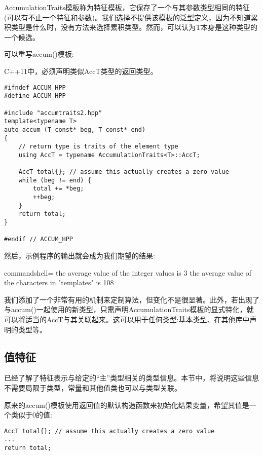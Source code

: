 AccumulationTraits模板称为特征模板，它保存了一个与其参数类型相同的特征(可以有不止一个特征和参数)。我们选择不提供该模板的泛型定义，因为不知道累积类型是什么时，没有方法来选择累积类型。然而，可以认为T本身是这种类型的一个候选。

可以重写accum()模板:

\begin{tcolorbox}[colback=webgreen!5!white,colframe=webgreen!75!black]
\hspace*{0.75cm}C++11中，必须声明类似AccT类型的返回类型。
\end{tcolorbox}

\begin{lstlisting}[style=styleCXX]
#ifndef ACCUM_HPP
#define ACCUM_HPP

#include "accumtraits2.hpp"
template<typename T>
auto accum (T const* beg, T const* end)
{
	// return type is traits of the element type
	using AccT = typename AccumulationTraits<T>::AccT;
	
	AccT total{}; // assume this actually creates a zero value
	while (beg != end) {
		total += *beg;
		++beg;
	}
	return total;
}

#endif // ACCUM_HPP
\end{lstlisting}

然后，示例程序的输出就会成为我们期望的结果:

\begin{tcblisting}{commandshell={}}
the average value of the integer values is 3
the average value of the characters in "templates" is 108
\end{tcblisting}

我们添加了一个非常有用的机制来定制算法，但变化不是很显著。此外，若出现了与accum()一起使用的新类型，只需声明AccumulationTraits模板的显式特化，就可以将适当的AccT与其关联起来。这可以用于任何类型:基本类型、在其他库中声明的类型等。

\subsection{值特征}

已经了解了特征表示与给定的“主”类型相关的类型信息。本节中，将说明这些信息不需要局限于类型，常量和其他值类也可以与类型关联。

原来的accum()模板使用返回值的默认构造函数来初始化结果变量，希望其值是一个类似于0的值:

\begin{lstlisting}[style=styleCXX]
AccT total{}; // assume this actually creates a zero value
...
return total;
\end{lstlisting}

